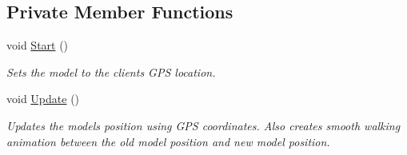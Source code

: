 \subsection*{Private Member Functions}
\begin{DoxyCompactItemize}
\item 
void \mbox{\hyperlink{class_model_controller_aeb277810748a80f9a3b9478d92c91b7b}{Start}} ()
\begin{DoxyCompactList}\small\item\em Sets the model to the clients G\+PS location. \end{DoxyCompactList}\item 
void \mbox{\hyperlink{class_model_controller_a267847d6963134144ac1e99e5dcff936}{Update}} ()
\begin{DoxyCompactList}\small\item\em Updates the models position using G\+PS coordinates. Also creates smooth walking animation between the old model position and new model position. \end{DoxyCompactList}\end{DoxyCompactItemize}
